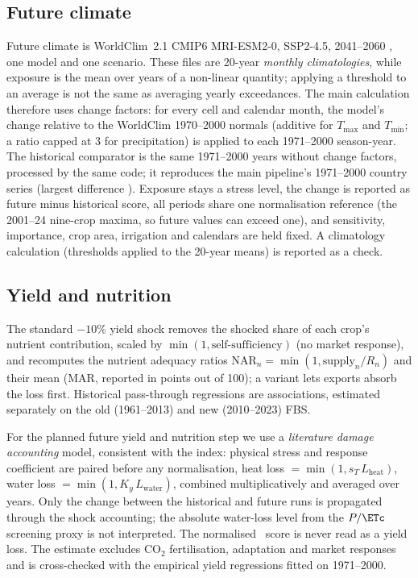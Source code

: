 \subsection{Future climate}
Future climate is WorldClim~2.1 CMIP6 MRI-ESM2-0, SSP2-4.5, 2041--2060 \citep{wcmip6}, one model and one
scenario. These files are 20-year \emph{monthly climatologies}, while exposure is the mean over years of a
non-linear quantity; applying a threshold to an average is not the same as averaging yearly exceedances.
The main calculation therefore uses change factors: for every cell and calendar month, the model's change
relative to the WorldClim 1970--2000 normals (additive for $T_{\max}$ and $T_{\min}$; a ratio capped at 3
for precipitation) is applied to each 1971--2000 season-year. The historical comparator is the same
1971--2000 years without change factors, processed by the same code; it reproduces the main pipeline's
1971--2000 country series (largest difference \histReproMaxDiff). Exposure stays a stress level, the
change is reported as future minus historical score, all periods share one normalisation reference
(the 2001--24 nine-crop maxima, so future values can exceed one), and sensitivity, importance, crop area,
irrigation and calendars are held fixed. A climatology calculation (thresholds applied to the 20-year
means) is reported as a check.

\subsection{Yield and nutrition}
The standard $-10\%$ yield shock removes the shocked share of each crop's nutrient contribution, scaled by
$\min(1,\text{self-sufficiency})$ (no market response), and recomputes the nutrient adequacy ratios
$\mathrm{NAR}_n = \min(1, \text{supply}_n/R_n)$ and their mean (MAR, reported in points out of 100);
a variant lets exports absorb the loss first. Historical pass-through regressions are associations,
estimated separately on the old (1961--2013) and new (2010--2023) FBS.

For the planned future yield and nutrition step we use a \emph{literature damage accounting} model,
consistent with the index: physical stress and response coefficient are paired before any normalisation,
heat loss $=\min(1, s_T\, L_{\text{heat}})$, water loss $=\min(1, K_y\, L_{\text{water}})$, combined
multiplicatively and averaged over years. Only the change between the historical and future runs is
propagated through the shock accounting; the absolute water-loss level from the $P/\ETc$ screening proxy is
not interpreted. The normalised \Fd\ score is never read as a yield loss. The estimate excludes CO$_2$
fertilisation, adaptation and market responses and is cross-checked with the empirical yield
regressions fitted on 1971--2000.
